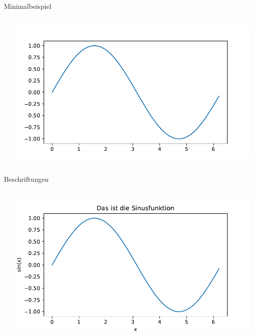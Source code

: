 \documentclass[xelatex,aspectratio=169]{beamer}
\begin{document}
\begin{frame}{Minimalbeispiel}
    \begin{columns}
        \begin{column}{0.5\textwidth}
            \inputminted{python}{src/plt_sin.py}
        \end{column}
        \begin{column}{0.5\textwidth}
            \includegraphics[width=\textwidth]{fig/plt_sin.pdf}
        \end{column}
    \end{columns}

\end{frame}

\begin{frame}{Beschriftungen}
    \begin{columns}
        \begin{column}{0.5\textwidth}
            \inputminted[firstline=4]{python}{src/plt_labels.py}
        \end{column}
        \begin{column}{0.5\textwidth}
            \includegraphics[width=\textwidth]{fig/plt_labels.pdf}
        \end{column}
    \end{columns}

\end{frame}
\end{document}
